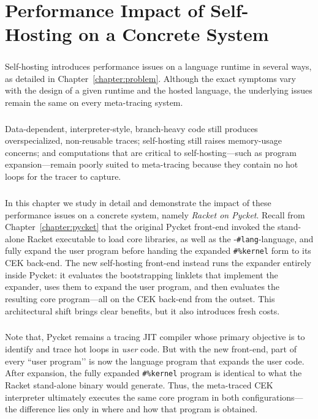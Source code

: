 \chapter{Performance Impact of Self-Hosting on a Concrete System}

	\label{chapter:analysis}

	\paragraph{}%
	 	Self-hosting introduces performance issues on a language runtime in several ways, as detailed in Chapter~\ref{chapter:problem}. Although the exact symptoms vary with the design of a given runtime and the hosted language, the underlying issues remain the same on every meta-tracing system.

	\paragraph{}%
	 	Data-dependent, interpreter-style, branch-heavy code still produces overspecialized, non-reusable traces; self-hosting still raises memory-usage concerns; and computations that are critical to self-hosting—such as program expansion—remain poorly suited to meta-tracing because they contain no hot loops for the tracer to capture.

	\paragraph{}%
	 	In this chapter we study in detail and demonstrate the impact of these performance issues on a concrete system, namely \emph{Racket on Pycket}. Recall from Chapter~\ref{chapter:pycket} that the original Pycket front-end invoked the stand-alone Racket executable to load core libraries, as well as the -\verb|#lang|-language, and fully expand the user program before handing the expanded \verb|#%kernel| form to its CEK back-end. The new self-hosting front-end instead runs the expander entirely inside Pycket: it evaluates the bootstrapping linklets that implement the expander, uses them to expand the user program, and then evaluates the resulting core program—all on the CEK back-end from the outset. This architectural shift brings clear benefits, but it also introduces fresh costs.

	\paragraph{}%
		Note that, Pycket remains a tracing JIT compiler whose primary objective is to identify and trace hot loops in \emph{user} code. But with the new front-end, part of every “user program’’ is now the language program that expands the user code. After expansion, the fully expanded \verb|#%kernel| program is identical to what the Racket stand-alone binary would generate. Thus, the meta-traced CEK interpreter ultimately executes the same core program in both configurations—the difference lies only in where and how that program is obtained.

